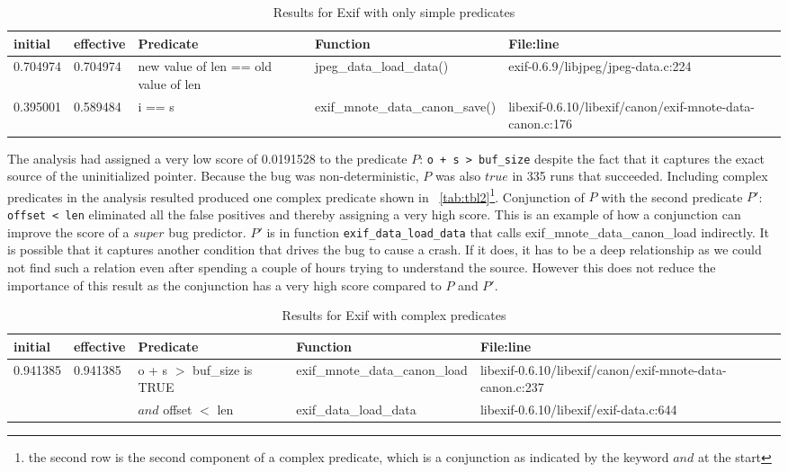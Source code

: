 \begin{table*}
\nocaptionrule
\caption{Results for Exif with only simple predicates}
\label{tab:tbl1}
\centering
\scriptsize
\begin{tabular}{lllll}
\toprule
initial & effective & Predicate & Function & File:line \\
\midrule
0.704974 & 0.704974 & new value of len == old value of len & jpeg\_data\_load\_data() & exif-0.6.9/libjpeg/jpeg-data.c:224 \\
0.395001 & 0.589484 & i == s & exif\_mnote\_data\_canon\_save() & libexif-0.6.10/libexif/canon/exif-mnote-data-canon.c:176 \\
\bottomrule
\end{tabular}
\end{table*}

The analysis had assigned a very low score of 0.0191528 to the predicate $P$: \texttt{o + s > buf\_size} despite the fact that it captures the exact source of the uninitialized pointer.  Because the bug was non-deterministic, $P$ was also $true$ in 335 runs that succeeded.  Including complex predicates in the analysis resulted produced one complex predicate shown in ~\autoref{tab:tbl2}{\footnote{the second row is the second component of a complex predicate, which is a conjunction as indicated by the keyword $and$ at the start}}.  Conjunction of $P$ with the second predicate $P'$: \texttt{offset < len} eliminated all the false positives and thereby assigning a very high score.  This is an example of how a conjunction can improve the score of a $super$ bug predictor.  $P'$ is in function \texttt{exif\_data\_load\_data} that calls exif\_mnote\_data\_canon\_load indirectly.  It is possible that it captures another condition that drives the bug to cause a crash.  If it does, it has to be a deep relationship as we could not find such a relation even after spending a couple of hours trying to understand the source.  However this does not reduce the importance of this result as the conjunction has a very high score compared to $P$ and $P'$.

\begin{table*}
\nocaptionrule
\caption{Results for Exif with complex predicates}
\label{tab:tbl2}
\centering
\scriptsize
\begin{tabular}{lllll}
\toprule
initial & effective & Predicate & Function & File:line \\
\midrule
0.941385 & 0.941385 & o + s $>$ buf\_size is TRUE & exif\_mnote\_data\_canon\_load &
 libexif-0.6.10/libexif/canon/exif-mnote-data-canon.c:237 \\
 
         &          & $and$ offset $<$ len & exif\_data\_load\_data & libexif-0.6.10/libexif/exif-data.c:644 \\
\bottomrule
\end{tabular}
\end{table*}

